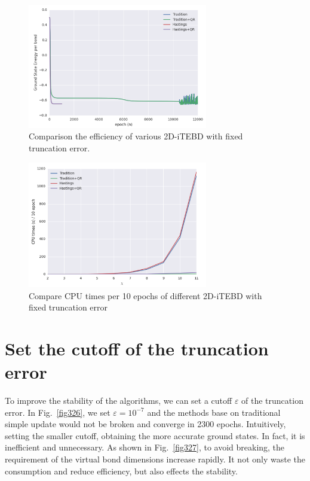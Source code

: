 \begin{figure}[ht]
	\centering
	\includegraphics[width=0.70\textwidth]{figures/fig325.png}
	\caption[Comparison the efficiency of various 2D-iTEBD]{Comparison the efficiency of various 2D-iTEBD with fixed truncation error.}
	\label{fig325}
\end{figure}

\begin{figure}[ht]
	\centering
	\includegraphics[width=0.70\textwidth]{figures/fig324.png}
	\caption[Compare CPU times per 10 epochs of different 2D-iTEBD with fixed trucation error]{Compare CPU times per 10 epochs of different 2D-iTEBD with fixed truncation error}
	\label{fig324}
\end{figure}

\section{Set the cutoff of the truncation error}

To improve the stability of the algorithms, we can set a cutoff $\varepsilon$ of the truncation error. In Fig.~\ref{fig326}, we set $\varepsilon = 10^{-7}$ and the methods base on traditional simple update would not be broken and converge in 2300 epochs. Intuitively, setting the smaller cutoff, obtaining the more accurate ground states. In fact,  it is inefficient and unnecessary. As shown in Fig.~\ref{fig327}, to avoid breaking, the requirement of the virtual bond dimensions increase rapidly. It not only waste the consumption and reduce efficiency, but also effects the stability. 

